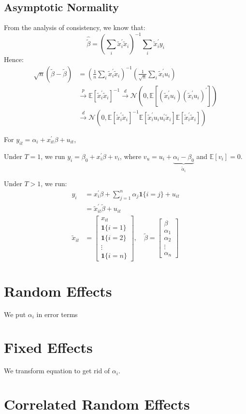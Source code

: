 \subsection{Asymptotic Normality}

From the analysis of consistency, we know that:
\[ 
\hat{\tilde{\beta}} = \left(\sum_i \tilde{x}_i^{\prime} \tilde{x}_i \right)^{-1} \sum_i \tilde{x}_i^{\prime} y_i
\]
Hence:
\begin{align*}
    \sqrt{n} (\hat{\tilde{\beta}} - \tilde{\beta}) &= \left(\frac{1}{n} \sum_i \tilde{x}_i^{\prime} \tilde{x}_i \right)^{-1} \left(\frac{1}{\sqrt{n} } \sum_i \tilde{x}_i^{\prime} u_i \right) \\
    & \overset{p}{\rightarrow}\mathbb{E}[\tilde{x}_i^{\prime} \tilde{x}_i]^{-1} \overset{d}{\rightarrow} \mathcal{N}\left(0, \mathbb{E}\left[\left(\tilde{x}_i^{\prime} u_i\right) \left(\tilde{x}_i^{\prime} u_i\right)^{\prime} \right] \right)\\
    & \overset{d}{\rightarrow} \mathcal{N} \left(0, \mathbb{E}\left[\tilde{x}_i^{\prime} \tilde{x}_i \right]^{-1} \mathbb{E}\left[\tilde{x}_i^{\prime} u_i u_i^{\prime} \tilde{x}_i \right] \mathbb{E}\left[\tilde{x}_i^{\prime} \tilde{x}_i \right] \right)
\end{align*}

For $y_{it} = \alpha_i + x_{it}^{\prime} \beta + u_{it} $,

Under $T=1$, we run $y_i = \beta_0 + x_i^{\prime} \beta + v_i$, 
where $v_u = u_i + \underset{\tilde{\alpha}_i}{\underbrace{\alpha_i - \beta_0}}$
and $\mathbb{E}[v_i] = 0$.

Under $T>1$, we run:
\begin{align*}
    y_i &= x_i^{\prime} \beta  + \sum_{j=1}^{n} \alpha_j \mathbf{1}\{i=j\} + u_{it} \\
    &= \tilde{x}_{it}^{\prime} \tilde{\beta} + u_{it} \\
    \tilde{x}_{it} &= \begin{bmatrix}
      x_{it} \\
      \mathbf{1}\{i=1\} \\
      \mathbf{1}\{i=2\} \\
      \vdots \\
      \mathbf{1}\{i=n\}
    \end{bmatrix}, \quad
    \tilde{\beta} = \begin{bmatrix}
      \beta \\
      \alpha_1 \\
      \alpha_2 \\
      \vdots \\
      \alpha_n
    \end{bmatrix}
\end{align*}

\section{Random Effects}
We put $\alpha_i$ in error terms



\section{Fixed Effects}
We transform equation to get rid of $\alpha_i$.




\section{Correlated Random Effects}
